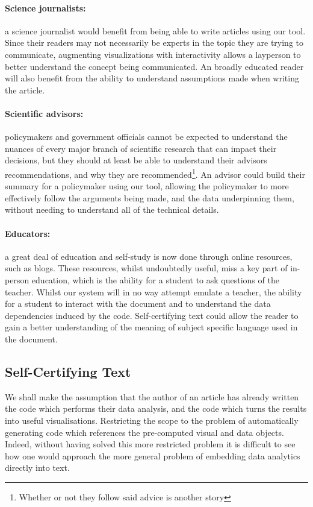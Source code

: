\paragraph{Science journalists:} a science journalist would benefit from being able to write articles using our tool.
Since their readers may not necessarily be experts in the topic they are trying to communicate, augmenting visualizations
with interactivity allows a layperson to better understand the concept being communicated. An broadly educated reader
will also benefit from the ability to understand assumptions made when writing the article.

\paragraph{Scientific advisors:} policymakers and government officials cannot be expected to understand the nuances of
every major branch of scientific research that can impact their decisions, but they should at least be able to
understand their advisors recommendations, and why they are recommended\footnote{Whether or not they follow said advice is another story}.
An advisor could build their summary for a policymaker using our tool, allowing the policymaker to more effectively
follow the arguments being made, and the data underpinning them, without needing to understand all of the technical details. 

\paragraph{Educators:} a great deal of education and self-study is now done through online resources, such as blogs.
These resources, whilst undoubtedly useful, miss a key part of in-person education, which is the ability for a student
to ask questions of the teacher. Whilst our system will in no way attempt emulate a teacher, the ability for a student
to interact with the document and to understand the data dependencies induced by the code. Self-certifying text could
allow the reader to gain a better understanding of the meaning of subject specific language used in the document. 


\subsection{Self-Certifying Text}
We shall make the assumption that the author of an article has already written the code which performs
their data analysis, and the code which turns the results into useful visualisations. Restricting the scope to the problem of
automatically generating code which references the pre-computed visual and data objects.
Indeed, without having solved this more restricted problem it is difficult to see how one would approach
the more general problem of embedding data analytics directly into text.

